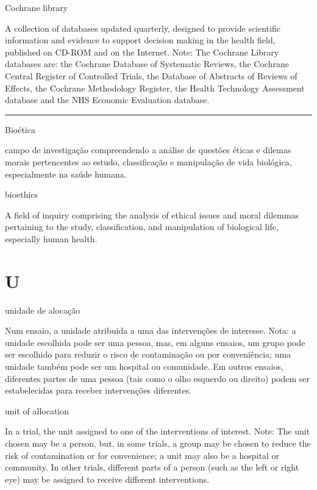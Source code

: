 \documentclass[
  openany]{book}
\begin{document}
Cochrane library

A collection of databases updated quarterly, designed to provide scientific information and evidence to support decision making in the health field, published on CD-ROM and on the Internet. Note: The Cochrane Library databases are: the Cochrane Database of Systematic Reviews, the Cochrane Central Register of Controlled Trials, the Database of Abstracts of Reviews of Effects, the Cochrane Methodology Register, the Health Technology Assessment database and the NHS Economic Evaluation database.

\begin{center}\rule{0.5\linewidth}{0.5pt}\end{center}

Bioética

campo de investigação compreendendo a análise de questões éticas e dilemas morais pertencentes ao estudo, classificação e manipulação de vida biológica, especialmente na saúde humana.

bioethics

A field of inquiry comprising the analysis of ethical issues and moral dilemmas pertaining to the study, classification, and manipulation of biological life, especially human health.

\hypertarget{u}{%
\chapter*{U}\label{u}}

unidade de alocação

Num ensaio, a unidade atribuida a uma das intervenções de interesse. Nota: a unidade escolhida pode ser uma pessoa, mas, em alguns ensaios, um grupo pode ser escolhido para reduzir o risco de contaminação ou por conveniência; uma unidade também pode ser um hospital ou comunidade. Em outros ensaios, diferentes partes de uma pessoa (tais como o olho esquerdo ou direito) podem ser estabelecidas para receber intervenções diferentes.

unit of allocation

In a trial, the unit assigned to one of the interventions of interest. Note: The unit chosen may be a person, but, in some trials, a group may be chosen to reduce the risk of contamination or for convenience; a unit may also be a hospital or community. In other trials, different parts of a person (such as the left or right eye) may be assigned to receive different interventions.
\end{document}
